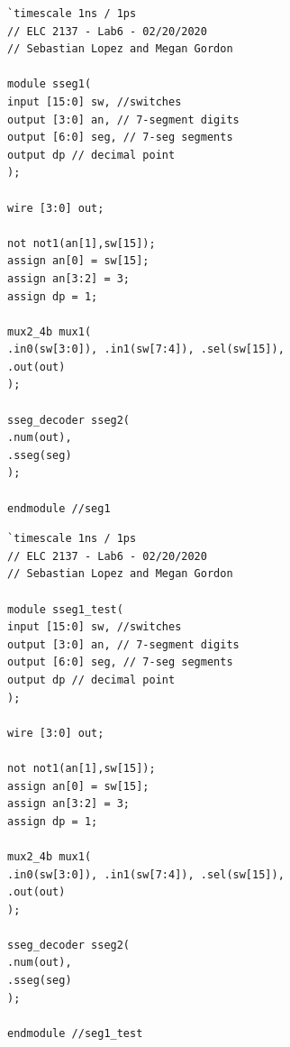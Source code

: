 \documentclass[11pt]{article}
\begin{document}
\begin{lstlisting}[style=Verilog,
caption=Sseg1 Source Code,
label=sseg1:ex
]
`timescale 1ns / 1ps
// ELC 2137 - Lab6 - 02/20/2020
// Sebastian Lopez and Megan Gordon

module sseg1(
input [15:0] sw, //switches 
output [3:0] an, // 7-segment digits
output [6:0] seg, // 7-seg segments
output dp // decimal point 
);

wire [3:0] out; 

not not1(an[1],sw[15]);
assign an[0] = sw[15];
assign an[3:2] = 3;
assign dp = 1; 

mux2_4b mux1(
.in0(sw[3:0]), .in1(sw[7:4]), .sel(sw[15]), 
.out(out) 
);

sseg_decoder sseg2(
.num(out),
.sseg(seg)
); 

endmodule //seg1
\end{lstlisting}

\begin{lstlisting}[style=Verilog,
caption=Sseg1 Test Bench Code,
label=sseg1_test:ex
]
`timescale 1ns / 1ps
// ELC 2137 - Lab6 - 02/20/2020
// Sebastian Lopez and Megan Gordon

module sseg1_test(
input [15:0] sw, //switches 
output [3:0] an, // 7-segment digits
output [6:0] seg, // 7-seg segments
output dp // decimal point 
);

wire [3:0] out; 

not not1(an[1],sw[15]);
assign an[0] = sw[15];
assign an[3:2] = 3;
assign dp = 1; 

mux2_4b mux1(
.in0(sw[3:0]), .in1(sw[7:4]), .sel(sw[15]), 
.out(out) 
);

sseg_decoder sseg2(
.num(out),
.sseg(seg)
); 

endmodule //seg1_test
\end{lstlisting}
\end{document}
